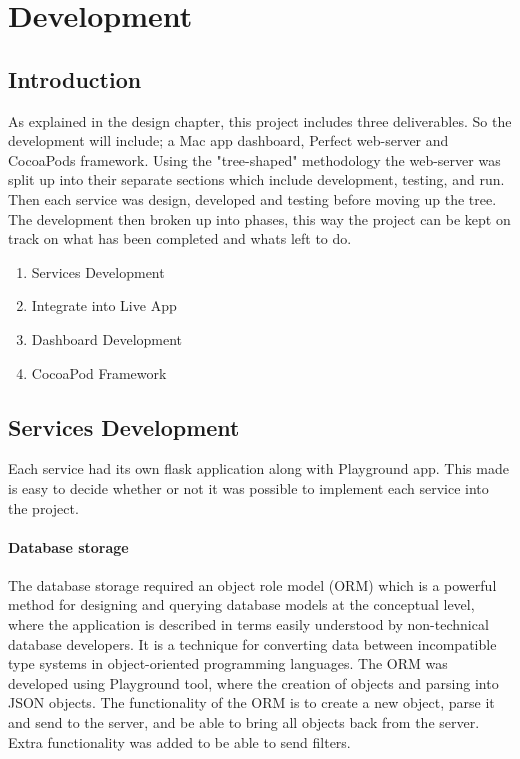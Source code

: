 \chapter{Development}

\label{ch:conclusions}

\section{Introduction}

As explained in the design chapter, this project includes three deliverables. So the development will include; a Mac app dashboard, Perfect web-server and CocoaPods framework. Using the "tree-shaped" methodology the web-server was split up into their separate sections which include development, testing, and run. Then each service was design, developed and testing before moving up the tree. The development then broken up into phases, this way the project can be kept on track on what has been completed and whats left to do.

\begin{enumerate}
  \item Services Development
  \item Integrate into Live App
  \item Dashboard Development
  \item CocoaPod Framework 
\end{enumerate}

\section{Services Development}

Each service had its own flask application along with Playground app. This made is easy to decide whether or not it was possible to implement each service into the project.

\subsubsection{Database storage}

The database storage required an object role model (ORM) which is a powerful method for designing and querying database models at the conceptual level, where the application is described in terms easily understood by non-technical database developers. It is a technique for converting data between incompatible type systems in object-oriented programming languages. The ORM was developed using Playground tool, where the creation of objects and parsing into JSON objects. The functionality of the ORM is to create a new object, parse it and send to the server, and be able to bring all objects back from the server. Extra functionality was added to be able to send filters.

